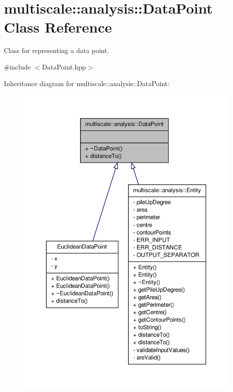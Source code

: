 \hypertarget{classmultiscale_1_1analysis_1_1DataPoint}{\section{multiscale\-:\-:analysis\-:\-:\-Data\-Point \-Class \-Reference}
\label{classmultiscale_1_1analysis_1_1DataPoint}
}


\-Class for representing a data point.  




{\ttfamily \#include $<$\-Data\-Point.\-hpp$>$}



\-Inheritance diagram for multiscale\-:\-:analysis\-:\-:\-Data\-Point\-:\nopagebreak
\begin{figure}[H]
\begin{center}
\leavevmode
\includegraphics[width=350pt]{classmultiscale_1_1analysis_1_1DataPoint__inherit__graph}
\end{center}
\end{figure}
